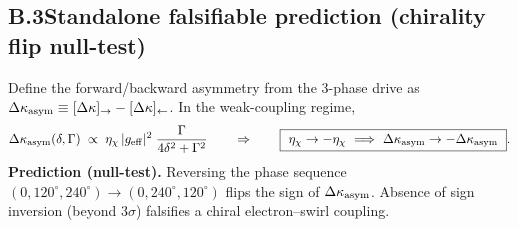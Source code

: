 \documentclass[aps,prb,preprint,amsmath,amssymb]{revtex4-2} %
\begin{document}
    \subsection*{B.3\quad Standalone falsifiable prediction (chirality flip null-test)}
        Define the forward/backward asymmetry from the 3-phase drive as
        \(\Delta\kappa_{\rm asym}\equiv[\Delta\kappa]_{\rightarrow}-[\Delta\kappa]_{\leftarrow}\).
        In the weak-coupling regime,
        \[
            \Delta\kappa_{\rm asym}(\delta,\Gamma)\;\propto\; \eta_\chi\,|g_{\rm eff}|^{2}\;\frac{\Gamma}{4\delta^{2}+\Gamma^{2}}
            \qquad\Rightarrow\qquad
            \boxed{\ \eta_\chi\to-\eta_\chi\ \Longrightarrow\ \Delta\kappa_{\rm asym}\to-\Delta\kappa_{\rm asym}\ }.
        \]
        \textbf{Prediction (null-test).} Reversing the phase sequence \((0,120^\circ,240^\circ)\!\to\!(0,240^\circ,120^\circ)\) flips the sign of \(\Delta\kappa_{\rm asym}\). Absence of sign inversion (beyond \(3\sigma\)) falsifies a chiral electron–swirl coupling.
\end{document}
